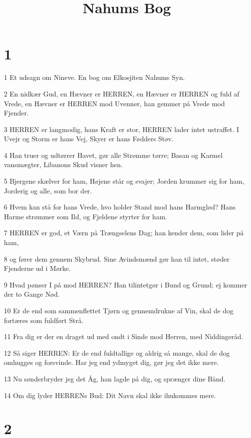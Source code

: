 

\title{Nahums Bog}


\chapter{1}

\par 1 Et udsagn om Nineve. En bog om Elkosjiten Nahums Syn.
\par 2 En nidkær Gud, en Hævner er HERREN, en Hævner er HERREN og fuld af Vrede, en Hævner er HERREN mod Uvenner, han gemmer på Vrede mod Fjender.
\par 3 HERREN er langmodig, hans Kraft er stor, HERREN lader intet ustraffet. I Uvejr og Storm er hans Vej, Skyer er hans Fødders Støv.
\par 4 Han truer og udtørrer Havet, gør alle Strømme tørre; Basan og Karmel vansmægter, Libanons Skud visner hen.
\par 5 Bjergene skælver for ham, Højene står og svajer; Jorden krummer sig for ham, Jorderig og alle, som bor der.
\par 6 Hvem kan stå for hans Vrede, hvo holder Stand mod hans Harmglød? Hans Harme strømmer som Ild, og Fjeldene styrter for ham.
\par 7 HERREN er god, et Værn på Trængselens Dag; han kender dem, som lider på ham,
\par 8 og fører dem gennem Skybrud. Sine Avindsmænd gør han til intet, støder Fjenderne ud i Mørke.
\par 9 Hvad pønser I på mod HERREN? Han tilintetgør i Bund og Grund; ej kommer der to Gange Nød.
\par 10 Er de end som sammenflettet Tjørn og gennemdrukne af Vin, skal de dog fortæres som fuldført Strå.
\par 11 Fra dig er der en draget ud med ondt i Sinde mod Herren, med Niddingeråd.
\par 12 Så siger HERREN: Er de end fuldtallige og aldrig så mange, skal de dog omhugges og forsvinde. Har jeg end ydmyget dig, gør jeg det ikke mere.
\par 13 Nu sønderbryder jeg det Åg, han lagde på dig, og sprænger dine Bånd.
\par 14 Om dig lyder HERRENs Bud: Dit Navn skal ikke ihukommes mere.

\chapter{2}

